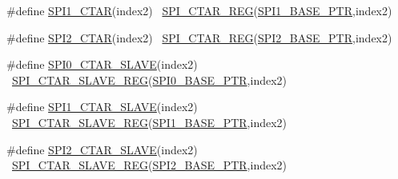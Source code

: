 \begin{DoxyCompactItemize}
\item 
\#define \hyperlink{group___s_p_i___register___accessor___macros_gacdd90c4720727e70d545f64fb6061adf}{S\+P\+I1\+\_\+\+C\+T\+AR}(index2)                                            ~\hyperlink{group___s_p_i___register___accessor___macros_ga5ab762c9000b796d14c1ce822eefc436}{S\+P\+I\+\_\+\+C\+T\+A\+R\+\_\+\+R\+EG}(\hyperlink{group___s_p_i___peripheral_gae28fd789e0602a32076c1c13ca39f5af}{S\+P\+I1\+\_\+\+B\+A\+S\+E\+\_\+\+P\+TR},index2)
\item 
\#define \hyperlink{group___s_p_i___register___accessor___macros_ga92466fc256ea12b3fcc939f006a8725e}{S\+P\+I2\+\_\+\+C\+T\+AR}(index2)                                            ~\hyperlink{group___s_p_i___register___accessor___macros_ga5ab762c9000b796d14c1ce822eefc436}{S\+P\+I\+\_\+\+C\+T\+A\+R\+\_\+\+R\+EG}(\hyperlink{group___s_p_i___peripheral_ga78714a4b750aa56fc56d1d223a560069}{S\+P\+I2\+\_\+\+B\+A\+S\+E\+\_\+\+P\+TR},index2)
\item 
\#define \hyperlink{group___s_p_i___register___accessor___macros_ga798105887218627609d0e8a5800f3ca9}{S\+P\+I0\+\_\+\+C\+T\+A\+R\+\_\+\+S\+L\+A\+VE}(index2)                                ~\hyperlink{group___s_p_i___register___accessor___macros_ga2025336cecfcf0c5b7cdb30e8056505b}{S\+P\+I\+\_\+\+C\+T\+A\+R\+\_\+\+S\+L\+A\+V\+E\+\_\+\+R\+EG}(\hyperlink{group___s_p_i___peripheral_ga851f64a97b5919c1f99a34db5918b3b4}{S\+P\+I0\+\_\+\+B\+A\+S\+E\+\_\+\+P\+TR},index2)
\item 
\#define \hyperlink{group___s_p_i___register___accessor___macros_ga94ba9eab472c3efa6152378d6c2c8275}{S\+P\+I1\+\_\+\+C\+T\+A\+R\+\_\+\+S\+L\+A\+VE}(index2)                                ~\hyperlink{group___s_p_i___register___accessor___macros_ga2025336cecfcf0c5b7cdb30e8056505b}{S\+P\+I\+\_\+\+C\+T\+A\+R\+\_\+\+S\+L\+A\+V\+E\+\_\+\+R\+EG}(\hyperlink{group___s_p_i___peripheral_gae28fd789e0602a32076c1c13ca39f5af}{S\+P\+I1\+\_\+\+B\+A\+S\+E\+\_\+\+P\+TR},index2)
\item 
\#define \hyperlink{group___s_p_i___register___accessor___macros_gab1b9b840508c9126b4749e73e04e1b62}{S\+P\+I2\+\_\+\+C\+T\+A\+R\+\_\+\+S\+L\+A\+VE}(index2)                                ~\hyperlink{group___s_p_i___register___accessor___macros_ga2025336cecfcf0c5b7cdb30e8056505b}{S\+P\+I\+\_\+\+C\+T\+A\+R\+\_\+\+S\+L\+A\+V\+E\+\_\+\+R\+EG}(\hyperlink{group___s_p_i___peripheral_ga78714a4b750aa56fc56d1d223a560069}{S\+P\+I2\+\_\+\+B\+A\+S\+E\+\_\+\+P\+TR},index2)
\end{DoxyCompactItemize}


